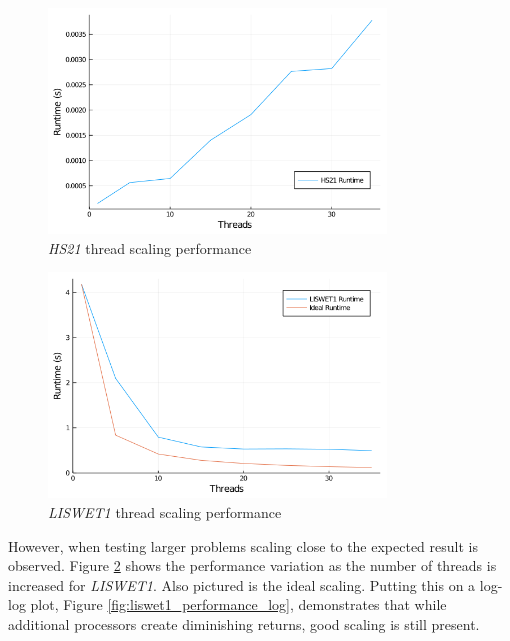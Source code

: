 \begin{figure}[tb]
    \centering
    \includegraphics[width=0.8\textwidth]{Plots/HS21 Scaling.png}
    \caption{\textit{HS21} thread scaling performance}
    \label{fig:hs21_threading}
\end{figure}

\begin{figure}[tb]
    \centering
    \includegraphics[width=0.8\textwidth]{Plots/LISWET1 Scaling.png}
    \caption{\textit{LISWET1} thread scaling performance}
    \label{fig:liswet1_performance}
\end{figure}

However, when testing larger problems scaling close to the expected result is observed. Figure \ref{fig:liswet1_performance} shows the performance variation as the number of threads is increased for \textit{LISWET1}. Also pictured is the ideal scaling. Putting this on a log-log plot, Figure \ref{fig:liswet1_performance_log}, demonstrates that while additional processors create diminishing returns, good scaling is still present. 

